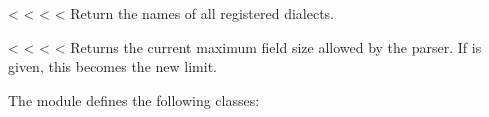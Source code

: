 \documentclass[letterpaper,10pt,english]{sphinxmanual}
\begin{document}
\begin{fulllineitems}
\label{\detokenize{csv:csv.list_dialects}}
<%
\pysigstartsignatures
<%
<%
<%
Return the names of all registered dialects.

\end{fulllineitems}


\vspace{5px}

\begin{fulllineitems}
\label{\detokenize{csv:csv.field_size_limit}}
<%
\pysigstartsignatures
<%
<%
<%
Returns the current maximum field size allowed by the parser. If  is
given, this becomes the new limit.

\end{fulllineitems}


The {\hyperref[\detokenize{csv:module-csv}]{}} module defines the following classes:

\vspace{5px}
\end{document}
